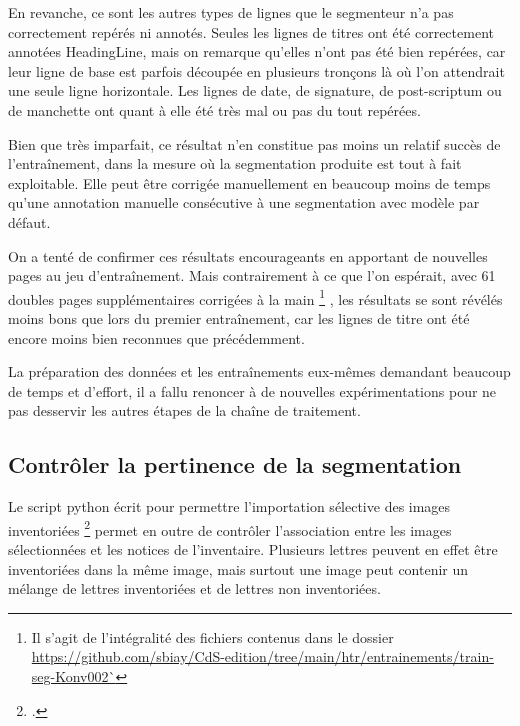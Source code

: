 \documentclass[a4paper,12pt,twoside]{book}
\begin{document}
    			En revanche, ce sont les autres types de lignes que le segmenteur n'a pas correctement repérés ni annotés. Seules les lignes de titres ont été correctement annotées \textsf{HeadingLine}, mais on remarque qu'elles n'ont pas été bien repérées, car leur ligne de base est parfois découpée en plusieurs tronçons là où l'on attendrait une seule ligne horizontale. Les lignes de date, de signature, de post-scriptum ou de manchette ont quant à elle été très mal ou pas du tout repérées.
    			
    			Bien que très imparfait, ce résultat n'en constitue pas moins un relatif succès de l'entraînement, dans la mesure où la \gls{segmentation} produite est tout à fait exploitable. Elle peut être corrigée manuellement en beaucoup moins de temps qu'une annotation manuelle consécutive à une \gls{segmentation} avec modèle par défaut.
    			
    			On a tenté de confirmer ces résultats encourageants en apportant de nouvelles pages au jeu d'entraînement. Mais contrairement à ce que l'on espérait, avec 61 doubles pages supplémentaires corrigées à la main
    			\footnote{Il s'agit de l'intégralité des fichiers contenus dans le dossier \url{https://github.com/sbiay/CdS-edition/tree/main/htr/entrainements/train-seg-Konv002`}}
    			, les résultats se sont révélés moins bons que lors du premier entraînement, car les lignes de titre ont été encore moins bien reconnues que précédemment. 
    			
    			La préparation des données et les entraînements eux-mêmes demandant beaucoup de temps et d'effort, il a fallu renoncer à de nouvelles expérimentations pour ne pas desservir les autres étapes de la chaîne de traitement.

	    		
	    	\subsection{Contrôler la pertinence de la \gls{segmentation}}
		    	\label{controle-segmentation-lettres-inventoriees}
	    		
	    		Le script python écrit pour permettre l'importation sélective des images inventoriées \footcite{biayDonneesImagesPy2022} permet en outre de contrôler l'association entre les images sélectionnées et les notices de l'inventaire. Plusieurs lettres peuvent en effet être inventoriées dans la même image, mais surtout une image peut contenir un mélange de lettres inventoriées et de lettres non inventoriées.
	    		
\end{document}
